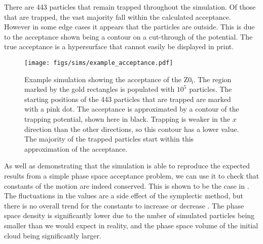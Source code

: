 There are 443 particles that remain trapped throughout the simulation.  Of those
that are trapped, the vast majority fall within the calculated acceptance.
However in some edge cases it appears that the particles are outside. This is
due to the acceptance shown being a contour on a cut-through of the potential.
The true acceptance is a hypersurface that cannot easily be displayed in print.

%
\begin{figure}
  \centering
  \texttt{[image: figs/sims/example\_acceptance.pdf]}
  \caption{Example simulation showing the acceptance of the $\mathrm{Z0_i}$.
  The region marked by the gold rectangles is populated with $10^5$ particles.
  The starting positions of the 443 particles that are trapped are marked with a pink dot.
  The acceptance is approximated by a contour of the trapping potential, shown
  here in black. Trapping is weaker in the $x$ direction than the other
  directions, so this contour has a lower value. The majority of the trapped
  particles start within this approximation of the acceptance.}
  \label{design:fig:acceptance}
\end{figure}

As well as demonstrating that the simulation is able to reproduce the expected
results from a simple phase space acceptance problem, we can use it to check
that constants of the motion are indeed conserved. This is shown to be the case
in .  The fluctuations in the values are a
side effect of the symplectic method, but there is no overall trend for the
constants to increase or decrease \cite{doi:10.1119/1.2034523}. The phase
space density is significantly lower due to the nmber of simulated particles
being smaller than we would expect in reality, and the phase space volume of
the initial cloud being significantly larger.

